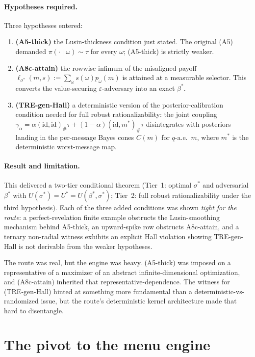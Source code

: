 \documentclass[11pt]{article}
\theoremstyle{definition}
\theoremstyle{remark}
\newcommand{\eps}{\varepsilon}
\begin{document}
\paragraph{Hypotheses required.}
Three hypotheses entered:
\begin{enumerate}[leftmargin=2em]
\item \textbf{(A5-thick)} the Lusin-thickness condition just stated.
The original (A5) demanded $\pi(\cdot\mid\omega)\sim\tau$ for every
$\omega$; (A5-thick) is strictly weaker.
\item \textbf{(A8c-attain)} the rowwise infimum of the misaligned
payoff $\ell_{\sigma^*}(m,s) := \sum_\omega s(\omega) p_\omega(m)$ is
attained at a measurable selector. This converts the value-securing
$\eps$-adversary into an exact $\beta^*$.
\item \textbf{(TRE-gen-Hall)} a deterministic version of the
posterior-calibration condition needed for full robust
rationalizability: the joint coupling
$\gamma_\alpha = \alpha(\mathrm{id},\mathrm{id})_\#\tau + (1-\alpha)(\mathrm{id},m^*)_\#\tau$
disintegrates with posteriors landing in the per-message Bayes cones
$C(m)$ for $q$-a.e.\ $m$, where $m^*$ is the deterministic
worst-message map.
\end{enumerate}

\paragraph{Result and limitation.}
This delivered a two-tier conditional theorem (Tier~1: optimal
$\sigma^*$ and adversarial $\beta^*$ with $U(\sigma^*) = U^* =
U(\beta^*,\sigma^*)$; Tier~2: full robust rationalizability under
the third hypothesis). Each of the three added conditions was shown
\emph{tight for the route}: a perfect-revelation finite example
obstructs the Lusin-smoothing mechanism behind A5-thick, an
upward-spike row obstructs A8c-attain, and a ternary non-radial
witness exhibits an explicit Hall violation showing TRE-gen-Hall is
not derivable from the weaker hypotheses.

The route was real, but the engine was heavy. (A5-thick) was imposed
on a representative of a maximizer of an abstract
infinite-dimensional optimization, and (A8c-attain) inherited that
representative-dependence. The witness for (TRE-gen-Hall) hinted at
something more fundamental than a deterministic-vs-randomized issue,
but the route's deterministic kernel architecture made that hard to
disentangle.

\section{The pivot to the menu engine}\label{sec:pivot}
\end{document}
